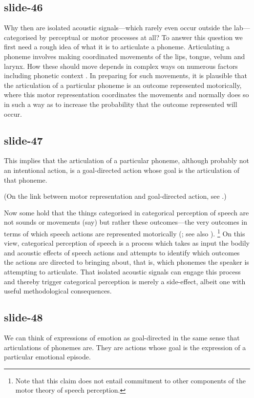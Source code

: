 \documentclass[12pt,\papersize]{extarticle}
\begin{document}
\subsection{slide-46}
Why then are isolated acoustic signals---which rarely even occur outside the lab---categorised by perceptual or motor processes at all?
To answer this question we first need a rough idea of what it is to articulate a phoneme.
Articulating a phoneme involves making coordinated movements of the lips, tongue, velum and larynx.
How these should move depends in complex ways on numerous factors including phonetic context \citep{Browman:1992da,Goldstein:2003bn}.
In preparing for such movements, it is plausible that the articulation of a particular phoneme is an outcome represented motorically,
where this motor representation coordinates the movements and normally does so in such a way as to increase the probability that the outcome represented will occur.

\subsection{slide-47}
This implies that the articulation of a particular phoneme,
although probably not an intentional action,
is a goal-directed action whose goal is the articulation of that phoneme.

(On the link between  motor representation and goal-directed action, see \citealp{butterfill:2012_intention}.)

Now some hold that the things categorised in categorical perception of speech are not sounds or movements (say) but rather these outcomes---the very outcomes in terms of which speech actions are represented motorically (\citealp{Liberman:2000gr}; see also \citealp{Browman:1992da}).%
\footnote{
Note that this claim does not entail commitment to other components of the motor theory of speech perception.
}
%
On this view,
categorical perception of speech is a process which takes as input the bodily and acoustic effects of speech actions and attempts to identify which outcomes the actions are directed to bringing about, that is, which phonemes the speaker is attempting to articulate.
That isolated acoustic signals can engage this process and thereby trigger categorical perception  is merely a side-effect, albeit one with useful methodological consequences.

\subsection{slide-48}
We can think of expressions of emotion as goal-directed in the same sense that
articulations of phonemes are.
They are actions whose goal is the expression of a particular emotional episode.
\end{document}
